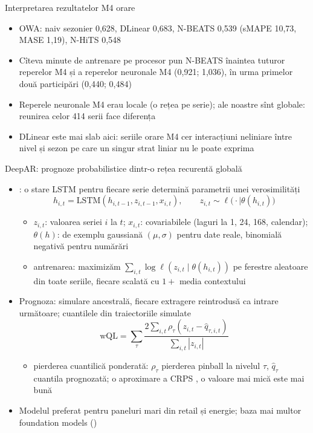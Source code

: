 \begin{frame}{Interpretarea rezultatelor M4 orare}
\itemsize{\small}
\begin{itemize}
    \item OWA: naiv sezonier 0{,}628, DLinear 0{,}683, N-BEATS 0{,}539 (sMAPE 10{,}73, MASE 1{,}19), N-HiTS 0{,}548
    \item Cîteva minute de antrenare pe procesor pun N-BEATS înaintea tuturor reperelor M4 și a reperelor neuronale M4 (0{,}921; 1{,}036), în urma primelor două participări (0{,}440; 0{,}484)
    \item Reperele neuronale M4 erau locale (o rețea pe serie); ale noastre sînt globale: reunirea celor 414 serii face diferența
    \item DLinear este mai slab aici: seriile orare M4 cer interacțiuni neliniare între nivel și sezon pe care un singur strat liniar nu le poate exprima
\end{itemize}
\end{frame}

\begin{frame}{DeepAR: prognoze probabilistice dintr-o rețea recurentă globală}
\itemsize{\small}
\begin{itemize}
    \item {}: o stare LSTM pentru fiecare serie determină parametrii unei verosimilități
    \[ h_{i,t} = \mathrm{LSTM}(h_{i,t-1}, z_{i,t-1}, x_{i,t}), \qquad z_{i,t} \sim \ell\big(\cdot\mid\theta(h_{i,t})\big) \]
    \begin{itemize}
        \item $z_{i,t}$: valoarea seriei $i$ la $t$; $x_{i,t}$: covariabilele (laguri la 1, 24, 168, calendar); $\theta(h)$: de exemplu gaussiană $(\mu, \sigma)$ pentru date reale, binomială negativă pentru numărări
        \item antrenarea: maximizăm $\sum_{i,t}\log\ell(z_{i,t}\mid\theta(h_{i,t}))$ pe ferestre aleatoare din toate seriile, fiecare scalată cu $1 + $ media contextului
    \end{itemize}
    \item Prognoza: simulare ancestrală, fiecare extragere reintrodusă ca intrare următoare; cuantilele din traiectoriile simulate
    \[ \mathrm{wQL} = \sum_\tau\frac{2\sum_{i,t}\rho_\tau(z_{i,t} - \hat q_{\tau,i,t})}{\sum_{i,t}|z_{i,t}|} \]
    \begin{itemize}
        \item pierderea cuantilică ponderată: $\rho_\tau$ pierderea pinball la nivelul $\tau$, $\hat q_\tau$ cuantila prognozată; o aproximare a CRPS , o valoare mai mică este mai bună
    \end{itemize}
    \item Modelul preferat pentru paneluri mari din retail și energie; baza mai multor foundation models ()
\end{itemize}
\end{frame}

